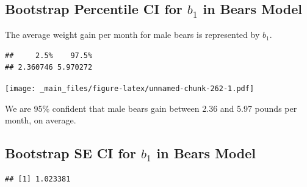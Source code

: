 \documentclass[]{book}
\newenvironment{Shaded}{\begin{snugshade}}{\end{snugshade}}
\newcommand{\KeywordTok}[1]{\textcolor[rgb]{0.13,0.29,0.53}{\textbf{#1}}}
\newcommand{\DecValTok}[1]{\textcolor[rgb]{0.00,0.00,0.81}{#1}}
\newcommand{\FloatTok}[1]{\textcolor[rgb]{0.00,0.00,0.81}{#1}}
\newcommand{\StringTok}[1]{\textcolor[rgb]{0.31,0.60,0.02}{#1}}
\newcommand{\OperatorTok}[1]{\textcolor[rgb]{0.81,0.36,0.00}{\textbf{#1}}}
\newcommand{\NormalTok}[1]{#1}
\begin{document}
\subsection{\texorpdfstring{Bootstrap Percentile CI for \(b_1\) in Bears
Model}{Bootstrap Percentile CI for b\_1 in Bears Model}}\label{bootstrap-percentile-ci-for-b_1-in-bears-model}

The average weight gain per month for male bears is represented by
\(b_1\).

\begin{Shaded}
\end{Shaded}

\begin{verbatim}
##     2.5%    97.5% 
## 2.360746 5.970272
\end{verbatim}

\texttt{[image: \_main\_files/figure-latex/unnamed-chunk-262-1.pdf]}

We are 95\% confident that male bears gain between 2.36 and 5.97 pounds
per month, on average.

\subsection{\texorpdfstring{Bootstrap SE CI for \(b_1\) in Bears
Model}{Bootstrap SE CI for b\_1 in Bears Model}}\label{bootstrap-se-ci-for-b_1-in-bears-model}

\begin{Shaded}
\end{Shaded}

\begin{verbatim}
## [1] 1.023381
\end{verbatim}
\end{document}
